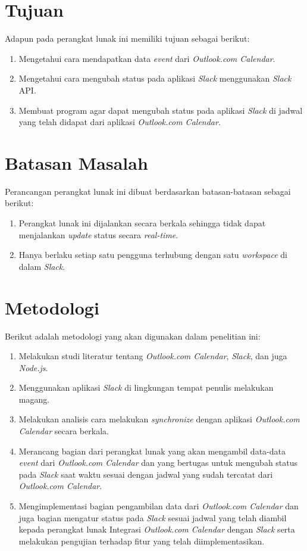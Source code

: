 \section{Tujuan}
\label{sec:tujuan}
Adapun pada perangkat lunak ini memiliki tujuan sebagai berikut:
\begin{enumerate}
	\item Mengetahui cara mendapatkan data \textit{event} dari \textit{Outlook.com Calendar}.   
	\item Mengetahui cara mengubah status pada aplikasi \textit{Slack} menggunakan \textit{Slack} API. 
	\item Membuat program agar dapat mengubah status pada aplikasi \textit{Slack} di jadwal yang telah didapat dari aplikasi \textit{Outlook.com Calendar}.  
	
\end{enumerate}

\section{Batasan Masalah}
\label{sec:batasan}
Perancangan perangkat lunak ini dibuat berdasarkan batasan-batasan sebagai berikut: 
\begin{enumerate}
	\item Perangkat lunak ini dijalankan secara berkala sehingga tidak dapat menjalankan \textit{update} status secara \textit{real-time}. 
	\item Hanya berlaku setiap satu pengguna terhubung dengan satu \textit{workspace} di dalam \textit{Slack}. 
\end{enumerate}

\section{Metodologi}
\label{sec:metlit}
Berikut adalah metodologi yang akan digunakan dalam penelitian ini: 
\begin{enumerate}
	\item Melakukan studi literatur tentang \textit{Outlook.com Calendar}, \textit{Slack}, dan juga \textit{Node.js}.
	\item Menggunakan aplikasi \textit{Slack} di lingkungan tempat penulis melakukan magang. 
	\item Melakukan analisis cara melakukan \textit{synchronize} dengan aplikasi \textit{Outlook.com Calendar} secara berkala. 
	\item Merancang bagian dari perangkat lunak yang akan mengambil data-data \textit{event} dari \textit{Outlook.com Calendar} dan yang bertugas untuk mengubah status pada \textit{Slack} saat waktu sesuai dengan jadwal yang sudah tercatat dari \textit{Outlook.com Calendar}.
	\item Mengimplementasi bagian pengambilan data dari \textit{Outlook.com Calendar} dan juga bagian mengatur status pada \textit{Slack} sesuai jadwal yang telah diambil kepada perangkat lunak Integrasi \textit{Outlook.com Calendar} dengan \textit{Slack} serta melakukan pengujian terhadap fitur yang telah diimplementasikan.
\end{enumerate}

